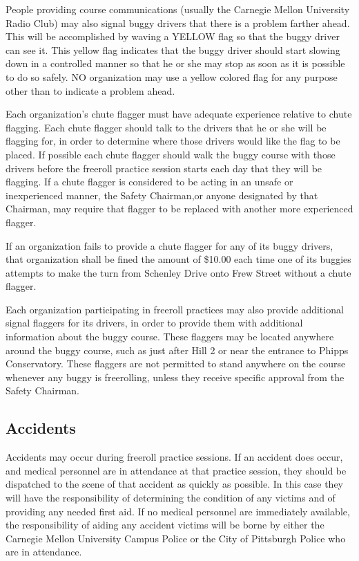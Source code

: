 \documentclass[openany]{book}
\begin{document}
People providing course communications (usually the Carnegie Mellon University Radio Club) may also signal buggy drivers that there is a problem farther ahead. This will be accomplished by waving a YELLOW flag so that the buggy driver can see it. This yellow flag indicates that the buggy driver should start slowing down in a controlled manner so that he or she may stop as soon as it is possible to do so safely. NO organization may use a yellow colored flag for any purpose other than to indicate a problem ahead.

Each organization's chute flagger must have adequate experience relative to chute flagging. Each chute flagger should talk to the drivers that he or she will be flagging for, in order to determine where those drivers would like the flag to be placed. If possible each chute flagger should walk the buggy course with those drivers before the freeroll practice session starts each day that they will be flagging. If a chute flagger is considered to be acting in an unsafe or inexperienced manner, the Safety Chairman,or anyone designated by that Chairman, may require that flagger to be replaced with another more experienced flagger.

If an organization fails to provide a chute flagger for any of its buggy drivers, that organization shall be fined the amount of \$10.00 each time one of its buggies attempts to make the turn from Schenley Drive onto Frew Street without a chute flagger.

Each organization participating in freeroll practices may also provide additional signal flaggers for its drivers, in order to provide them with additional information about the buggy course. These flaggers may be located anywhere around the buggy course, such as just after Hill 2 or near the entrance to Phipps Conservatory. These flaggers are not permitted to stand anywhere on the course whenever any buggy is freerolling, unless they receive specific approval from the Safety Chairman.

\subsection{Accidents}

Accidents may occur during freeroll practice sessions. If an accident does occur, and medical personnel are in attendance at that practice session, they should be dispatched to the scene of that accident as quickly as possible. In this case they will have the responsibility of determining the condition of any victims and of providing any needed first aid. If no medical personnel are immediately available, the responsibility of aiding any accident victims will be borne by either the Carnegie Mellon University Campus Police or the City of Pittsburgh Police who are in attendance.
\end{document}
